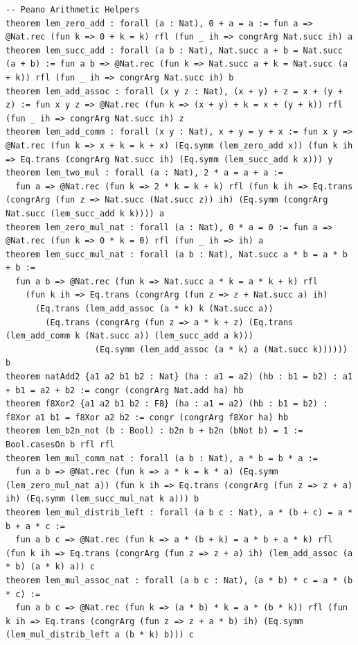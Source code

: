 \documentclass[11pt,letterpaper]{article}
\theoremstyle{spectralthm}
\begin{document}
\begin{lstlisting}[language=Lean4,caption={Standalone Pure Init.Prelude Term-Mode Lean 4 Kernel Suite (thm30--thm61, v0.0.0, 0 sorry, 0 axioms).},label={lst:lean_unified}]
-- Peano Arithmetic Helpers
theorem lem_zero_add : forall (a : Nat), 0 + a = a := fun a => @Nat.rec (fun k => 0 + k = k) rfl (fun _ ih => congrArg Nat.succ ih) a
theorem lem_succ_add : forall (a b : Nat), Nat.succ a + b = Nat.succ (a + b) := fun a b => @Nat.rec (fun k => Nat.succ a + k = Nat.succ (a + k)) rfl (fun _ ih => congrArg Nat.succ ih) b
theorem lem_add_assoc : forall (x y z : Nat), (x + y) + z = x + (y + z) := fun x y z => @Nat.rec (fun k => (x + y) + k = x + (y + k)) rfl (fun _ ih => congrArg Nat.succ ih) z
theorem lem_add_comm : forall (x y : Nat), x + y = y + x := fun x y => @Nat.rec (fun k => x + k = k + x) (Eq.symm (lem_zero_add x)) (fun k ih => Eq.trans (congrArg Nat.succ ih) (Eq.symm (lem_succ_add k x))) y
theorem lem_two_mul : forall (a : Nat), 2 * a = a + a :=
  fun a => @Nat.rec (fun k => 2 * k = k + k) rfl (fun k ih => Eq.trans (congrArg (fun z => Nat.succ (Nat.succ z)) ih) (Eq.symm (congrArg Nat.succ (lem_succ_add k k)))) a
theorem lem_zero_mul_nat : forall (a : Nat), 0 * a = 0 := fun a => @Nat.rec (fun k => 0 * k = 0) rfl (fun _ ih => ih) a
theorem lem_succ_mul_nat : forall (a b : Nat), Nat.succ a * b = a * b + b :=
  fun a b => @Nat.rec (fun k => Nat.succ a * k = a * k + k) rfl
    (fun k ih => Eq.trans (congrArg (fun z => z + Nat.succ a) ih)
      (Eq.trans (lem_add_assoc (a * k) k (Nat.succ a))
        (Eq.trans (congrArg (fun z => a * k + z) (Eq.trans (lem_add_comm k (Nat.succ a)) (lem_succ_add a k)))
                  (Eq.symm (lem_add_assoc (a * k) a (Nat.succ k)))))) b
theorem natAdd2 {a1 a2 b1 b2 : Nat} (ha : a1 = a2) (hb : b1 = b2) : a1 + b1 = a2 + b2 := congr (congrArg Nat.add ha) hb
theorem f8Xor2 {a1 a2 b1 b2 : F8} (ha : a1 = a2) (hb : b1 = b2) : f8Xor a1 b1 = f8Xor a2 b2 := congr (congrArg f8Xor ha) hb
theorem lem_b2n_not (b : Bool) : b2n b + b2n (bNot b) = 1 := Bool.casesOn b rfl rfl
theorem lem_mul_comm_nat : forall (a b : Nat), a * b = b * a :=
  fun a b => @Nat.rec (fun k => a * k = k * a) (Eq.symm (lem_zero_mul_nat a)) (fun k ih => Eq.trans (congrArg (fun z => z + a) ih) (Eq.symm (lem_succ_mul_nat k a))) b
theorem lem_mul_distrib_left : forall (a b c : Nat), a * (b + c) = a * b + a * c :=
  fun a b c => @Nat.rec (fun k => a * (b + k) = a * b + a * k) rfl (fun k ih => Eq.trans (congrArg (fun z => z + a) ih) (lem_add_assoc (a * b) (a * k) a)) c
theorem lem_mul_assoc_nat : forall (a b c : Nat), (a * b) * c = a * (b * c) :=
  fun a b c => @Nat.rec (fun k => (a * b) * k = a * (b * k)) rfl (fun k ih => Eq.trans (congrArg (fun z => z + a * b) ih) (Eq.symm (lem_mul_distrib_left a (b * k) b))) c


\end{lstlisting}
\end{document}
